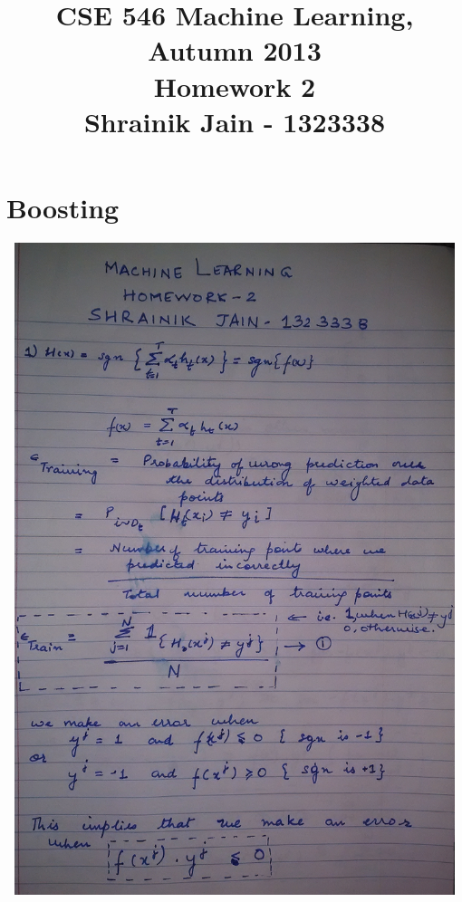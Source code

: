 \documentclass[letterpaper]{article}
\title{CSE 546 Machine Learning, Autumn 2013 \\ Homework 2 \\ Shrainik Jain - 1323338}
\date{}
\begin{document}
\maketitle
\section{Boosting} 
%
%
\includegraphics[width = 5.9in, height = 7.5in]{1.png}
\end{document}
